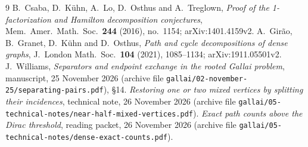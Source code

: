 \documentclass[11pt]{article}
\theoremstyle{definition}
\begin{document}
\begin{thebibliography}{9}
 B.~Csaba, D.~K\"uhn, A.~Lo, D.~Osthus and A.~Treglown, \emph{Proof of the 1-factorization and Hamilton decomposition conjectures}, Mem.\ Amer.\ Math.\ Soc.\ \textbf{244} (2016), no.~1154; arXiv:1401.4159v2.
 A.~Gir\~ao, B.~Granet, D.~K\"uhn and D.~Osthus, \emph{Path and cycle decompositions of dense graphs}, J.\ London Math.\ Soc.\ \textbf{104} (2021), 1085--1134; arXiv:1911.05501v2.
 J.~Williams, \emph{Separators and endpoint exchange in the rooted Gallai problem}, manuscript, 25 November 2026 (archive file \texttt{gallai/02-november-25/separating-pairs.pdf}), \S14.
 \emph{Restoring one or two mixed vertices by splitting their incidences}, technical note, 26 November 2026 (archive file \texttt{gallai/05-technical-notes/near-half-mixed-vertices.pdf}).
 \emph{Exact path counts above the Dirac threshold}, reading packet, 26 November 2026 (archive file \texttt{gallai/05-technical-notes/dense-exact-counts.pdf}).
\end{thebibliography}
\end{document}
